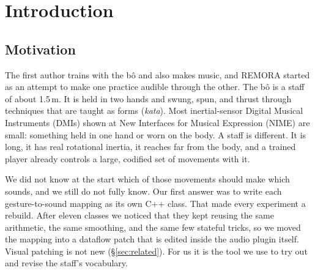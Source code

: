 \documentclass[sigconf,nonacm]{acmart}
\begin{document}
\maketitle

\section{Introduction}

\subsection{Motivation}
The first author trains with the b\^o and also makes music, and REMORA started as an attempt to
make one practice audible through the other. The b\^o is a staff of about 1.5\,m. It is held in two
hands and swung, spun, and thrust through techniques that are taught as forms (\emph{kata}). Most
inertial-sensor Digital Musical Instruments (DMIs) shown at New Interfaces for Musical Expression
(NIME) are small: something held in one hand or worn on the body. A staff is different. It is long,
it has real rotational inertia, it reaches far from the body, and a trained player already controls
a large, codified set of movements with it.

We did not know at the start which of those movements should make which sounds, and we still do
not fully know. Our first answer was to write each gesture-to-sound mapping as its own C++ class.
That made every experiment a rebuild. After eleven classes we noticed that they kept reusing the
same arithmetic, the same smoothing, and the same few stateful tricks, so we moved the mapping into
a dataflow patch that is edited inside the audio plugin itself. Visual patching is not new
(\S\ref{sec:related}). For us it is the tool we use to try out and revise the staff's vocabulary.
\end{document}
